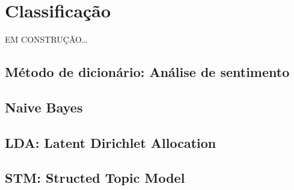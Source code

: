 \documentclass[]{book}
\begin{document}
\hypertarget{classificacao}{%
\chapter{Classificação}\label{classificacao}}

EM CONSTRUÇÃO\ldots{}

\hypertarget{muxe9todo-de-dicionuxe1rio-anuxe1lise-de-sentimento}{%
\section{Método de dicionário: Análise de sentimento}\label{muxe9todo-de-dicionuxe1rio-anuxe1lise-de-sentimento}}

\hypertarget{naive-bayes}{%
\section{Naive Bayes}\label{naive-bayes}}

\hypertarget{lda-latent-dirichlet-allocation}{%
\section{LDA: Latent Dirichlet Allocation}\label{lda-latent-dirichlet-allocation}}

\hypertarget{stm-structed-topic-model}{%
\section{STM: Structed Topic Model}\label{stm-structed-topic-model}}


\end{document}
